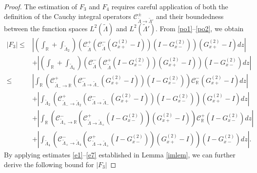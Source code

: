 \documentclass[10pt,a4paper]{amsart}
\begin{document}
\begin{proof}
The estimation of $F_{3}$ and $F_{4}$ requires careful application of both the definition of the Cauchy integral operators $\mathcal{C}_{\widetilde{\Lambda}\rightarrow\widetilde{\Lambda}'}^{\pm}$ and their boundedness between the function spaces $L^{2}(\widetilde{\Lambda})$ and $L^{2}(\widetilde{\Lambda}')$. From \eqref{po1}--\eqref{po2}, we obtain
\begin{equation}
\begin{aligned}\nonumber
\left|F_{3}\right|\leq&\left|\left(\int_{\mathbb{R}}+\int_{\widetilde{\Lambda}_{2}}\right)\left(\mathcal{C}_{\widetilde{\Lambda}}^{+}\left(\mathcal{C}_{\widetilde{\Lambda}}^{-}\left(G^{(2)}_{x+}-I\right)\right)\left(I-G^{(2)}_{x-}\right)\right)\left(G^{(2)}_{x+}-I\right)dz\right|\\
&+\left|\left(\int_{\mathbb{R}}+\int_{\widetilde{\Lambda}_{4}}\right)\left(\mathcal{C}_{\widetilde{\Lambda}}^{-}\left(\mathcal{C}_{\widetilde{\Lambda}}^{+}\left(I-G^{(2)}_{x-}\right)\right)\left(G^{(2)}_{x+}-I\right)\right)\left(I-G^{(2)}_{x-}\right)dz\right|\\
\leq&\left|\int_{\mathbb{R}}\left(\mathcal{C}_{\widetilde{\Lambda}_{-}\rightarrow\mathbb{R}}^{+}\left(\mathcal{C}_{\widetilde{\Lambda}\rightarrow\widetilde{\Lambda}_{-}}^{-}\left(G^{(2)}_{x+}-I\right)\right)\left(I-G^{(2)}_{x-}\right)\right)\mathcal{C}_{\mathbb{R}}^{-}\left(G^{(2)}_{x+}-I\right)dz\right|\\
&+\left|\int_{\widetilde{\Lambda}_{2}}\left(\mathcal{C}_{\widetilde{\Lambda}_{-}\rightarrow\widetilde{\Lambda}_{2}}^{+}\left(\mathcal{C}_{\widetilde{\Lambda}\rightarrow\widetilde{\Lambda}_{-}}^{-}\left(G^{(2)}_{x+}-I\right)\right)\left(I-G^{(2)}_{x-}\right)\right)\left(G^{(2)}_{x+}-I\right)dz\right|\\
&+\left|\int_{\mathbb{R}}\left(\mathcal{C}_{\widetilde{\Lambda}_{+}\rightarrow\mathbb{R}}^{-}\left(\mathcal{C}_{\widetilde{\Lambda}\rightarrow\widetilde{\Lambda}_{+}}^{+}\left(I-G^{(2)}_{x-}\right)\right)\left(G^{(2)}_{x+}-I\right)\right)\mathcal{C}_{\mathbb{R}}^{+}\left(I-G^{(2)}_{x-}\right)dz\right|\\
&+\left|\int_{\widetilde{\Lambda}_{4}}\left(\mathcal{C}_{\widetilde{\Lambda}_{+}\rightarrow\widetilde{\Lambda}_{4}}^{-}\left(\mathcal{C}_{\widetilde{\Lambda}\rightarrow\widetilde{\Lambda}_{+}}^{+}\left(I-G^{(2)}_{x-}\right)\right)\left(G^{(2)}_{x+}-I\right)\right)\left(I-G^{(2)}_{x-}\right)dz\right|.
\end{aligned}
\end{equation}
By applying estimates \eqref{e1}--\eqref{e7} established in Lemma \ref{imlem}, we can further derive the following bound for $\left|F_{3}\right|$

\end{proof}
\end{document}
